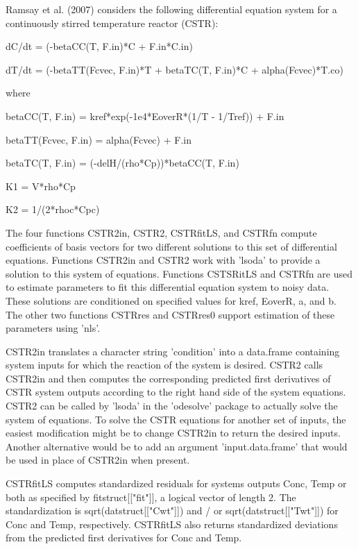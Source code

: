 \begin{Details}\relax
Ramsay et al. (2007) considers the following differential equation 
system for a continuously stirred temperature reactor (CSTR):

dC/dt = (-betaCC(T, F.in)*C + F.in*C.in)

dT/dt = (-betaTT(Fcvec, F.in)*T + betaTC(T, F.in)*C +
alpha(Fcvec)*T.co)

where

betaCC(T, F.in) = kref*exp(-1e4*EoverR*(1/T - 1/Tref)) + F.in

betaTT(Fcvec, F.in) = alpha(Fcvec) + F.in

betaTC(T, F.in) = (-delH/(rho*Cp))*betaCC(T, F.in)


K1 = V*rho*Cp

K2 = 1/(2*rhoc*Cpc)  

The four functions CSTR2in, CSTR2, CSTRfitLS, and CSTRfn compute
coefficients of basis vectors for two different solutions to this set
of differential equations.  Functions CSTR2in and CSTR2 work with
'lsoda' to provide a solution to this system of equations.  Functions 
CSTSRitLS and CSTRfn are used to estimate parameters to fit this
differential equation system to noisy data.  These solutions are
conditioned on specified values for kref, EoverR, a, and b.  The other
two functions CSTRres and CSTRres0 support estimation of these
parameters using 'nls'.    

CSTR2in translates a character string 'condition' into a data.frame
containing system inputs for which the reaction of the system is
desired.  CSTR2 calls CSTR2in and then computes the corresponding
predicted first derivatives of CSTR system outputs according to the
right hand side of the system equations.  CSTR2 can be called by
'lsoda' in the 'odesolve' package to actually solve the system of
equations.  To solve the CSTR equations for another set of inputs, the
easiest modification might be to change CSTR2in to return the desired
inputs.  Another alternative would be to add an argument
'input.data.frame' that would be used in place of CSTR2in when
present.

CSTRfitLS computes standardized residuals for systems outputs Conc, 
Temp or both as specified by fitstruct[["fit"]], a logical vector of 
length 2.  The standardization is sqrt(datstruct[["Cwt"]]) and / or
sqrt(datstruct[["Twt"]]) for Conc and Temp, respectively.  CSTRfitLS
also returns standardized deviations from the predicted first
derivatives for Conc and Temp.


\end{Details}
